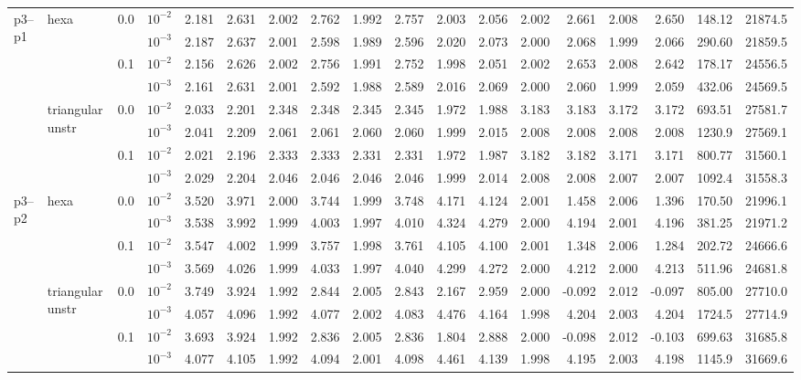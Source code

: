 \begin{longtable}{llclrrrrrrrrrrrrrr}
\multirow{8}{*}{p3--p1} & \multirow{4}{*}{hexa} & \multirow{2}{*}{0.0} & $10^{-2}$ & 2.181 & 2.631 & 2.002 & 2.762 & 1.992 & 2.757 & 2.003 & 2.056 & 2.002 & 2.661 & 2.008 & 2.650 & 148.12 & 21874.5 \\
& & & $10^{-3}$ & 2.187 & 2.637 & 2.001 & 2.598 & 1.989 & 2.596 & 2.020 & 2.073 & 2.000 & 2.068 & 1.999 & 2.066 & 290.60 & 21859.5 \\\cline{3-18}
& & \multirow{2}{*}{0.1} & $10^{-2}$ & 2.156 & 2.626 & 2.002 & 2.756 & 1.991 & 2.752 & 1.998 & 2.051 & 2.002 & 2.653 & 2.008 & 2.642 & 178.17 & 24556.5 \\
& & & $10^{-3}$ & 2.161 & 2.631 & 2.001 & 2.592 & 1.988 & 2.589 & 2.016 & 2.069 & 2.000 & 2.060 & 1.999 & 2.059 & 432.06 & 24569.5 \\\cline{2-18}
& \multirow{4}{*}{triangular unstr} & \multirow{2}{*}{0.0} & $10^{-2}$ & 2.033 & 2.201 & 2.348 & 2.348 & 2.345 & 2.345 & 1.972 & 1.988 & 3.183 & 3.183 & 3.172 & 3.172 & 693.51 & 27581.7 \\
& & & $10^{-3}$ & 2.041 & 2.209 & 2.061 & 2.061 & 2.060 & 2.060 & 1.999 & 2.015 & 2.008 & 2.008 & 2.008 & 2.008 & 1230.9 & 27569.1 \\\cline{3-18}
& & \multirow{2}{*}{0.1} & $10^{-2}$ & 2.021 & 2.196 & 2.333 & 2.333 & 2.331 & 2.331 & 1.972 & 1.987 & 3.182 & 3.182 & 3.171 & 3.171 & 800.77 & 31560.1 \\
& & & $10^{-3}$ & 2.029 & 2.204 & 2.046 & 2.046 & 2.046 & 2.046 & 1.999 & 2.014 & 2.008 & 2.008 & 2.007 & 2.007 & 1092.4 & 31558.3 \\\hline

\multirow{8}{*}{p3--p2} & \multirow{4}{*}{hexa} & \multirow{2}{*}{0.0} & $10^{-2}$ & 3.520 & 3.971 & 2.000 & 3.744 & 1.999 & 3.748 & 4.171 & 4.124 & 2.001 & 1.458 & 2.006 & 1.396 & 170.50 & 21996.1 \\
& & & $10^{-3}$ & 3.538 & 3.992 & 1.999 & 4.003 & 1.997 & 4.010 & 4.324 & 4.279 & 2.000 & 4.194 & 2.001 & 4.196 & 381.25 & 21971.2 \\\cline{3-18}
& & \multirow{2}{*}{0.1} & $10^{-2}$ & 3.547 & 4.002 & 1.999 & 3.757 & 1.998 & 3.761 & 4.105 & 4.100 & 2.001 & 1.348 & 2.006 & 1.284 & 202.72 & 24666.6 \\
& & & $10^{-3}$ & 3.569 & 4.026 & 1.999 & 4.033 & 1.997 & 4.040 & 4.299 & 4.272 & 2.000 & 4.212 & 2.000 & 4.213 & 511.96 & 24681.8 \\\cline{2-18}
& \multirow{4}{*}{triangular unstr} & \multirow{2}{*}{0.0} & $10^{-2}$ & 3.749 & 3.924 & 1.992 & 2.844 & 2.005 & 2.843 & 2.167 & 2.959 & 2.000 & -0.092 & 2.012 & -0.097 & 805.00 & 27710.0 \\
& & & $10^{-3}$ & 4.057 & 4.096 & 1.992 & 4.077 & 2.002 & 4.083 & 4.476 & 4.164 & 1.998 & 4.204 & 2.003 & 4.204 & 1724.5 & 27714.9 \\\cline{3-18}
& & \multirow{2}{*}{0.1} & $10^{-2}$ & 3.693 & 3.924 & 1.992 & 2.836 & 2.005 & 2.836 & 1.804 & 2.888 & 2.000 & -0.098 & 2.012 & -0.103 & 699.63 & 31685.8 \\
& & & $10^{-3}$ & 4.077 & 4.105 & 1.992 & 4.094 & 2.001 & 4.098 & 4.461 & 4.139 & 1.998 & 4.195 & 2.003 & 4.198 & 1145.9 & 31669.6 \\\hline


\end{longtable}
